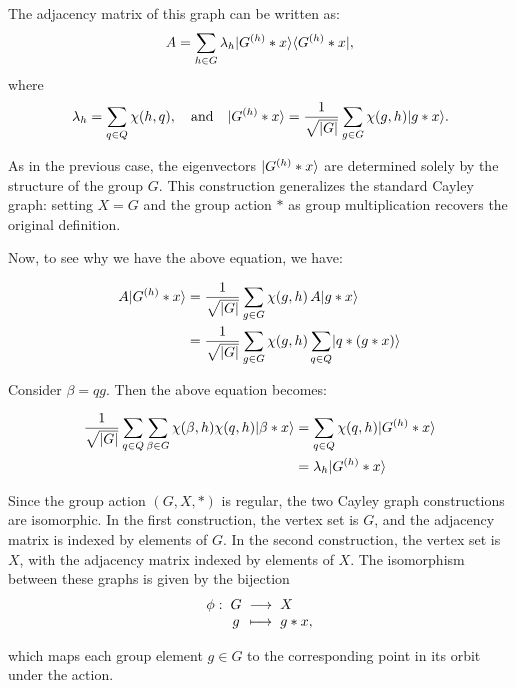 \documentclass[12pt]{report}
\begin{document}
The adjacency matrix of this graph can be written as:
\[
A = \sum_{h \in G} \lambda_h \lvert G^{(h)} * x\rangle \langle G^{(h)} * x\rvert,
\]
where
\[
\lambda_h = \sum_{q \in Q} \chi(h, q), \quad \text{and} \quad \lvert G^{(h)} * x\rangle = \frac{1}{\sqrt{|G|}} \sum_{g \in G} \chi(g, h) \lvert g * x\rangle.
\]

As in the previous case, the eigenvectors \( \lvert G^{(h)} * x\rangle \) are determined solely by the structure of the group \( G \). This construction generalizes the standard Cayley graph: setting \( X = G \) and the group action \( * \) as group multiplication recovers the original definition.


Now, to see why we have the above equation, we have:



\begin{align}
    A\lvert G^{(h)} * x\rangle 
    &= \frac{1}{\sqrt{|G|}}\sum_{g \in G} \chi(g, h)\, A\lvert g * x\rangle \nonumber \\
    &= \frac{1}{\sqrt{|G|}}\sum_{g \in G} \chi(g, h)\sum_{q \in Q} \lvert q * (g * x)\rangle \nonumber
    \end{align}
    
    \noindent Consider $\beta = qg$. Then the above equation becomes:
    
    \begin{align}
    \frac{1}{\sqrt{|G|}}\sum_{q \in Q} \sum_{\beta \in G} \chi(\beta, h)\chi(q, h)\lvert\beta * x\rangle
    &= \sum_{q \in Q} \chi(q, h)\lvert G^{(h)} * x\rangle \nonumber \\
    &= \lambda_h \lvert G^{(h)} * x\rangle \label{eq:group_action_symmetrized}
    \end{align}

    Since the group action \( (G, X, *) \) is regular, the two Cayley graph constructions are isomorphic. In the first construction, the vertex set is \( G \), and the adjacency matrix is indexed by elements of \( G \). In the second construction, the vertex set is \( X \), with the adjacency matrix indexed by elements of \( X \). The isomorphism between these graphs is given by the bijection
\[
\setlength{\arraycolsep}{1mm}
\begin{array}{rcll}
\phi: & G & \longrightarrow & X \\
      & g & \longmapsto     & g * x,
\end{array}
\]

which maps each group element \( g \in G \) to the corresponding point in its orbit under the action.
\end{document}
